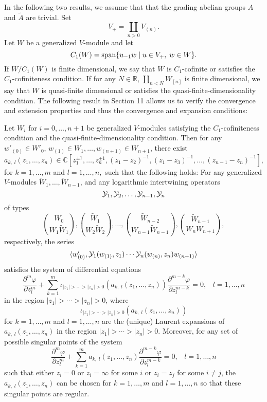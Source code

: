 \documentclass[12pt]{article}
\begin{document}
In the following two results, we assume that that the grading abelian
groups $A$ and $\tilde{A}$ are trivial.  Set
\[
V_{+}=\coprod_{n>0}V_{(n)}.
\]
Let $W$ be a
generalized $V$-module and let 
\[
C_{1}(W)={\rm span}\{u_{-1}w\;|\; u\in V_{+},\;
w\in W\}.  
\]
If $W/C_{1}(W)$ is finite dimensional, we say that $W$ is
$C_{1}$-cofinite or satisfies the $C_{1}$-cofiniteness condition. If
for any $N\in {\mathbb R}$, $\coprod_{n<N}W_{[n]}$ is finite
dimensional, we say that $W$ is quasi-finite dimensional or satisfies
the quasi-finite-dimensionality condition.  The following result in
Section 11 allows us to verify the convergence and extension
properties and thus the convergence and expansion conditions:

\setcounter{rema}{5}

\begin{theo}
Let $W_{i}$ for $i=0, \dots, n+1$ be generalized $V$-modules
satisfying the $C_{1}$-cofiniteness condition and the
quasi-finite-dimensionality condition. Then for any $w'_{(0)}\in W'_{0}$, 
$w_{(1)}\in W_{1}, \dots,
w_{(n+1)}\in W_{n+1}$, there exist
\[
a_{k, \;l}(z_{1}, \dots, z_{n})\in {\mathbb C}[z_{1}^{\pm 1}, \dots,
z_{n}^{\pm 1}, (z_{1}-z_{2})^{-1}, (z_{1}-z_{3})^{-1}, \dots,
(z_{n-1}-z_{n})^{-1}],
\]
for $k=1, \dots, m$ and $l=1, \dots, n,$ such that the following 
holds: For any generalized
$V$-modules $\widetilde{W}_{1}, \dots, \widetilde{W}_{n-1}$, and any logarithmic 
intertwining operators 
\[
{\cal Y}_{1}, {\cal Y}_{2}, \dots, {\cal
Y}_{n-1}, {\cal Y}_{n}
\]
of types 
\[
{W_{0}\choose
W_{1}\widetilde{W}_{1}}, {\widetilde{W}_{1}\choose
W_{2}\widetilde{W}_{2}}, \dots, {\widetilde{W}_{n-2}\choose
W_{n-1}\widetilde{W}_{n-1}}, {\widetilde{W}_{n-1}\choose
W_{n}W_{n+1}},
\]
respectively, the series
\[
\langle w'_{(0)}, {\cal Y}_{1}(w_{(1)}, z_{1})\cdots {\cal Y}_{n}(w_{(n)},
z_{n})w_{(n+1)}\rangle
\]
satisfies the system of differential equations
\[
\frac{\partial^{m}\varphi}{\partial z_{l}^{m}}+ \sum_{k=1}^{m}
\iota_{|z_{1}|>\cdots >|z_{n}|>0}(a_{k,
\;l}(z_{1}, \dots, z_{n})) \frac{\partial^{m-k}\varphi}{\partial
z_{l}^{m-k}}=0,\;\;\;l=1, \dots, n
\]
in the region $|z_{1}|>\cdots >|z_{n}|>0$, where 
\[
\iota_{|z_{1}|>\cdots >|z_{n}|>0}(a_{k,
\;l}(z_{1}, \dots, z_{n}))
\]
for $k=1, \dots, m$ and $l=1, \dots, n$ are the (unique) Laurent
expansions of $a_{k, \;l}(z_{1}, \dots, z_{n})$ in the region
$|z_{1}|>\cdots >|z_{n}|>0$.  Moreover, for any set of possible
singular points of the system
\[
\frac{\partial^{m}\varphi}{\partial z_{l}^{m}}+ \sum_{k=1}^{m} a_{k,
\;l}(z_{1}, \dots, z_{n})\frac{\partial^{m-k}\varphi}{\partial
z_{l}^{m-k}}=0,\;\;\;l=1, \dots, n
\]
such that either $z_i = 0$ or $z_i = \infty$ for some $i$ or $z_i =
z_j$ for some $i \ne j$, the $a_{k, \;l}(z_{1}, \dots, z_{n})$ can be
chosen for $k=1, \dots, m$ and $l=1, \dots, n$ so that these singular
points are regular.
\end{theo}
\end{document}
